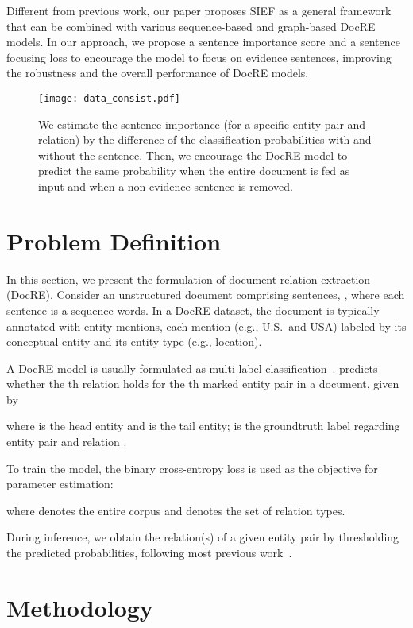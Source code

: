 \documentclass[11pt]{article}
\begin{document}
Different from previous work, our paper proposes SIEF as a general framework that can be combined with various sequence-based and graph-based DocRE models. In our approach, we propose a sentence importance score and a sentence focusing loss to encourage the model to focus on evidence sentences, improving the robustness and the overall performance of DocRE models.

\begin{figure*}[ht!]
  \centering
  \texttt{[image: data\_consist.pdf]}
  \caption{We estimate the sentence importance (for a specific entity pair and relation) by the difference of the classification probabilities with and without the sentence. Then, we encourage the DocRE model to predict the same probability when the entire document is fed as input and when a non-evidence sentence is removed.}
  \label{fig2:data_consistent}
\end{figure*}

\section{Problem Definition}
\label{sec3}
In this section, we present the formulation of document relation extraction (DocRE). Consider an unstructured document comprising  sentences, , where each sentence  is a sequence words. In a DocRE dataset, the document  is typically annotated with entity mentions, each mention (e.g., U.S.~and USA) labeled by its conceptual entity  and its entity type (e.g., location).

A DocRE model  is usually formulated as multi-label classification~\cite{yao-etal-2019-docred}.  predicts  whether the th relation holds for the th marked entity pair in a document, given by

where  is the head entity and  is the tail entity;   is the groundtruth label regarding entity pair  and relation .

To train the model, the binary cross-entropy loss is used as the objective for parameter estimation:

where  denotes the entire corpus and  denotes the set of relation types.

During inference, we obtain the relation(s) of a given entity pair by thresholding the predicted probabilities, following most previous work~\cite{yao-etal-2019-docred,zhou2021atlop}.

\section{Methodology}
\label{sec4}
\end{document}
